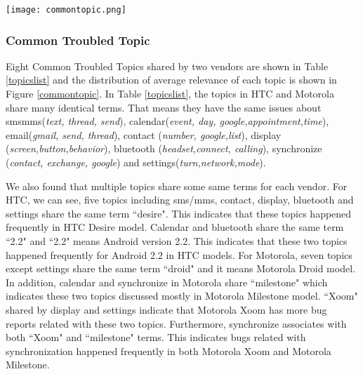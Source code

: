 \documentclass[10pt, conference, compsocconf]{IEEEtran}
\begin{document}
\begin{figure*}[htb]
\centering
\texttt{[image: commontopic.png]}
\caption{Common Troubled Topics in HTC and Motorola}
\label{commontopic}
\end{figure*}

\subsubsection{Common Troubled Topic} 
Eight Common Troubled Topics shared by two vendors are shown in Table \ref{topicslist} and the distribution of average relevance of each topic is shown in Figure \ref{commontopic}. 
In Table \ref{topicslist}, the topics in HTC and Motorola share many identical terms. That means they have the same issues about sms\/mms(\textit{text, thread, send}), calendar(\textit{event, day, google,appointment,time}), email(\textit{gmail, send, thread}), contact (\textit{number, google,list}), display (\textit{screen,button,behavior}), bluetooth (\textit{headset,connect, calling}), synchronize (\textit{contact, exchange, google}) and settings(\textit{turn,network,mode}). 

We also found that multiple topics share some same terms for each vendor. For HTC, we can see, five topics including sms/mms, contact, display, bluetooth and settings share the same term ``desire". This indicates that these topics happened frequently in HTC Desire model. Calendar and bluetooth share the same term ``2.2" and ``2.2" means Android version 2.2. This indicates that these two topics happened frequently for Android 2.2 in HTC models. For Motorola, seven topics except settings share the same term ``droid" and it means Motorola Droid model. In addition, calendar and synchronize in Motorola share ``milestone" which indicates these two topics discussed mostly in Motorola Milestone model. ``Xoom" shared by display and settings indicate that Motorola Xoom has more bug reports related with these two topics. Furthermore, synchronize associates with both ``Xoom" and ``milestone" terms. This indicates bugs related with synchronization happened frequently in both Motorola Xoom and Motorola Milestone. 
\end{document}
